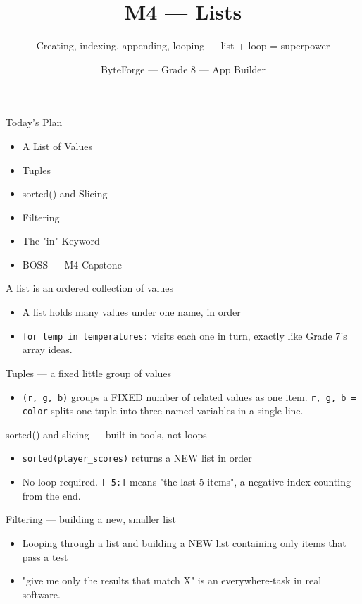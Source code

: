 \documentclass[aspectratio=169]{beamer}
\title{M4 — Lists}
\subtitle{Creating, indexing, appending, looping — list + loop = superpower}
\author{ByteForge --- Grade 8 --- App Builder}
\date{}
\begin{document}
\begin{frame}
    \titlepage
\end{frame}

\begin{frame}{Today's Plan}
    \begin{itemize}
        \item A List of Values
        \item Tuples
        \item sorted() and Slicing
        \item Filtering
        \item The "in" Keyword
        \item[$\bigstar$] BOSS --- M4 Capstone
    \end{itemize}
\end{frame}

\begin{frame}{A list is an ordered collection of values}
    \large
    \begin{itemize}
        \item A list holds many values under one name, in order
        \item \texttt{for temp in temperatures:} visits each one in turn, exactly like Grade 7's array ideas.
    \end{itemize}
\end{frame}


\begin{frame}{Tuples — a fixed little group of values}
    \large
    \begin{itemize}
        \item \texttt{(r, g, b)} groups a FIXED number of related values as one item. \texttt{r, g, b = color} splits one tuple into three named variables in a single line.
    \end{itemize}
\end{frame}


\begin{frame}{sorted() and slicing — built-in tools, not loops}
    \large
    \begin{itemize}
        \item \texttt{sorted(player\_scores)} returns a NEW list in order
        \item No loop required. \texttt{[-5:]} means "the last 5 items", a negative index counting from the end.
    \end{itemize}
\end{frame}


\begin{frame}{Filtering — building a new, smaller list}
    \large
    \begin{itemize}
        \item Looping through a list and building a NEW list containing only items that pass a test
        \item "give me only the results that match X" is an everywhere-task in real software.
    \end{itemize}
\end{frame}
\end{document}
